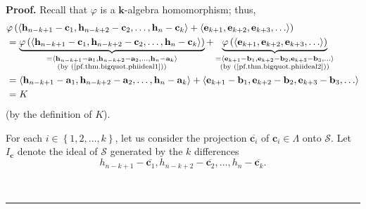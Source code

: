 \documentclass[numbers=enddot,12pt,final,onecolumn,notitlepage]{scrartcl}%
\theoremstyle{definition}
\newenvironment{proof}[1][Proof]{\noindent\textbf{#1.} }{\ \rule{0.5em}{0.5em}}
\begin{document}
\begin{proof}
Recall that $\varphi$ is a $\mathbf{k}$-algebra homomorphism; thus,%
\begin{align}
&  \varphi\left(  \left\langle \mathbf{h}_{n-k+1}-\mathbf{c}_{1}%
,\mathbf{h}_{n-k+2}-\mathbf{c}_{2},\ldots,\mathbf{h}_{n}-\mathbf{c}%
_{k}\right\rangle +\left\langle \mathbf{e}_{k+1},\mathbf{e}_{k+2}%
,\mathbf{e}_{k+3},\ldots\right\rangle \right) \nonumber\\
&  =\underbrace{\varphi\left(  \left\langle \mathbf{h}_{n-k+1}-\mathbf{c}%
_{1},\mathbf{h}_{n-k+2}-\mathbf{c}_{2},\ldots,\mathbf{h}_{n}-\mathbf{c}%
_{k}\right\rangle \right)  }_{\substack{=\left\langle \mathbf{h}%
_{n-k+1}-\mathbf{a}_{1},\mathbf{h}_{n-k+2}-\mathbf{a}_{2},\ldots
,\mathbf{h}_{n}-\mathbf{a}_{k}\right\rangle \\\text{(by
(\ref{pf.thm.bigquot.phiideal1}))}}}+\underbrace{\varphi\left(  \left\langle
\mathbf{e}_{k+1},\mathbf{e}_{k+2},\mathbf{e}_{k+3},\ldots\right\rangle
\right)  }_{\substack{=\left\langle \mathbf{e}_{k+1}-\mathbf{b}_{1}%
,\mathbf{e}_{k+2}-\mathbf{b}_{2},\mathbf{e}_{k+3}-\mathbf{b}_{3}%
,\ldots\right\rangle \\\text{(by (\ref{pf.thm.bigquot.phiideal2}))}%
}}\nonumber\\
&  =\left\langle \mathbf{h}_{n-k+1}-\mathbf{a}_{1},\mathbf{h}_{n-k+2}%
-\mathbf{a}_{2},\ldots,\mathbf{h}_{n}-\mathbf{a}_{k}\right\rangle
+\left\langle \mathbf{e}_{k+1}-\mathbf{b}_{1},\mathbf{e}_{k+2}-\mathbf{b}%
_{2},\mathbf{e}_{k+3}-\mathbf{b}_{3},\ldots\right\rangle \nonumber\\
&  =K \label{pf.thm.bigquot.phiidealK}%
\end{align}
(by the definition of $K$).

For each $i\in\left\{  1,2,\ldots,k\right\}  $, let us consider the projection
$\overline{\mathbf{c}_{i}}$ of $\mathbf{c}_{i}\in\Lambda$ onto $\mathcal{S}$.
Let $I_{\mathbf{c}}$ denote the ideal of $\mathcal{S}$ generated by the $k$
differences%
\[
h_{n-k+1}-\overline{\mathbf{c}_{1}},h_{n-k+2}-\overline{\mathbf{c}_{2}}%
,\ldots,h_{n}-\overline{\mathbf{c}_{k}}.
\]



\end{proof}
\end{document}
